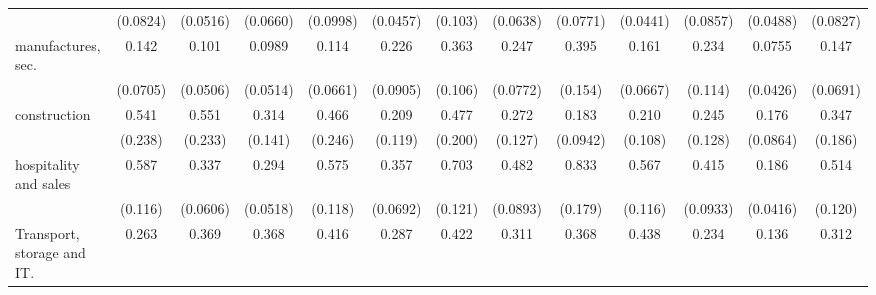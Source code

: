 {\begin{tabular}{l*{12}{c}}
                    &    (0.0824)         &    (0.0516)         &    (0.0660)         &    (0.0998)         &    (0.0457)         &     (0.103)         &    (0.0638)         &    (0.0771)         &    (0.0441)         &    (0.0857)         &    (0.0488)         &    (0.0827)         \\
[1em]
manufactures, sec.  &       0.142\sym{***}&       0.101\sym{***}&      0.0989\sym{***}&       0.114\sym{***}&       0.226\sym{***}&       0.363\sym{***}&       0.247\sym{***}&       0.395\sym{*}  &       0.161\sym{***}&       0.234\sym{**} &      0.0755\sym{***}&       0.147\sym{***}\\
                    &    (0.0705)         &    (0.0506)         &    (0.0514)         &    (0.0661)         &    (0.0905)         &     (0.106)         &    (0.0772)         &     (0.154)         &    (0.0667)         &     (0.114)         &    (0.0426)         &    (0.0691)         \\
[1em]
construction        &       0.541         &       0.551         &       0.314\sym{*}  &       0.466         &       0.209\sym{**} &       0.477         &       0.272\sym{**} &       0.183\sym{***}&       0.210\sym{**} &       0.245\sym{**} &       0.176\sym{***}&       0.347\sym{*}  \\
                    &     (0.238)         &     (0.233)         &     (0.141)         &     (0.246)         &     (0.119)         &     (0.200)         &     (0.127)         &    (0.0942)         &     (0.108)         &     (0.128)         &    (0.0864)         &     (0.186)         \\
[1em]
hospitality and sales&       0.587\sym{**} &       0.337\sym{***}&       0.294\sym{***}&       0.575\sym{**} &       0.357\sym{***}&       0.703\sym{*}  &       0.482\sym{***}&       0.833         &       0.567\sym{**} &       0.415\sym{***}&       0.186\sym{***}&       0.514\sym{**} \\
                    &     (0.116)         &    (0.0606)         &    (0.0518)         &     (0.118)         &    (0.0692)         &     (0.121)         &    (0.0893)         &     (0.179)         &     (0.116)         &    (0.0933)         &    (0.0416)         &     (0.120)         \\
[1em]
Transport, storage and IT.&       0.263\sym{***}&       0.369\sym{**} &       0.368\sym{***}&       0.416\sym{**} &       0.287\sym{***}&       0.422\sym{***}&       0.311\sym{***}&       0.368\sym{**} &       0.438\sym{**} &       0.234\sym{***}&       0.136\sym{***}&       0.312\sym{**} \\

\end{tabular}}
